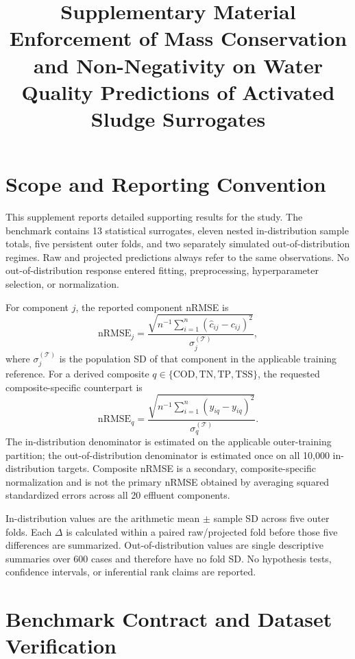\documentclass[a4paper,10pt]{article}
\title{Supplementary Material\\Enforcement of Mass Conservation and Non-Negativity on Water Quality Predictions of Activated Sludge Surrogates}
\author{}
\date{}
\begin{document}
\maketitle

\section{Scope and Reporting Convention}

This supplement reports detailed supporting results for the study. The benchmark contains 13 statistical surrogates, eleven nested in-distribution sample totals, five persistent outer folds, and two separately simulated out-of-distribution regimes. Raw and projected predictions always refer to the same observations. No out-of-distribution response entered fitting, preprocessing, hyperparameter selection, or normalization.

For component $j$, the reported component nRMSE is
\begin{equation}
\mathrm{nRMSE}_j=
\frac{\sqrt{n^{-1}\sum_{i=1}^{n}(\hat c_{ij}-c_{ij})^2}}
{\sigma_j^{(\mathcal T)}},
\end{equation}
where $\sigma_j^{(\mathcal T)}$ is the population SD of that component in the applicable training reference. For a derived composite $q\in\{\mathrm{COD},\mathrm{TN},\mathrm{TP},\mathrm{TSS}\}$, the requested composite-specific counterpart is
\begin{equation}
\mathrm{nRMSE}_q=
\frac{\sqrt{n^{-1}\sum_{i=1}^{n}(\hat y_{iq}-y_{iq})^2}}
{\sigma_q^{(\mathcal T)}}.
\end{equation}
The in-distribution denominator is estimated on the applicable outer-training partition; the out-of-distribution denominator is estimated once on all 10,000 in-distribution targets. Composite nRMSE is a secondary, composite-specific normalization and is not the primary nRMSE obtained by averaging squared standardized errors across all 20 effluent components.

In-distribution values are the arithmetic mean $\pm$ sample SD across five outer folds. Each $\Delta$ is calculated within a paired raw/projected fold before those five differences are summarized. Out-of-distribution values are single descriptive summaries over 600 cases and therefore have no fold SD. No hypothesis tests, confidence intervals, or inferential rank claims are reported.

\section{Benchmark Contract and Dataset Verification}
\end{document}
